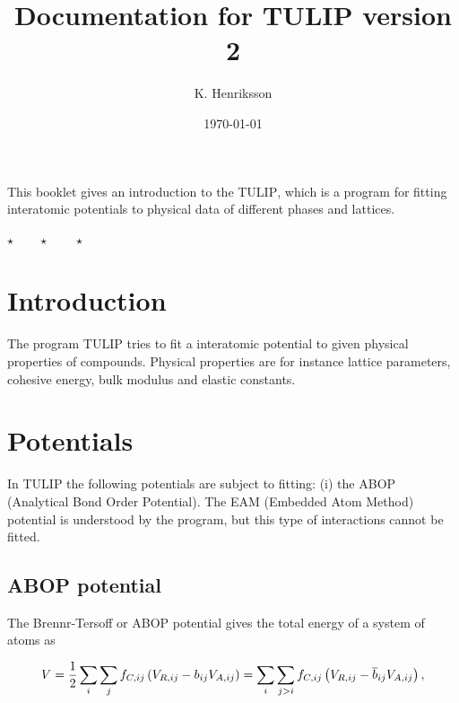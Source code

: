 \documentclass[a4paper,12pt,onecolumn]{article}
\newcommand{\stars}{\begin{center} \vspace{0.5cm}$\star \qquad \star \qquad \star$\vspace{0.5cm}\end{center}}
\begin{document}
\title{
Documentation for \textsc{TULIP}
version 2
}
\author{K. Henriksson}
\date{\today}

\maketitle

\abstract

This booklet gives an introduction to the \textsc{TULIP}, which is
a program for fitting interatomic potentials to physical data
of different phases and lattices.

\stars


\tableofcontents





\section{Introduction}

The program \textsc{TULIP} tries to fit a interatomic potential
to given physical properties of compounds. Physical properties are
for instance lattice parameters, cohesive energy, bulk modulus and
elastic constants.





\section{Potentials}

In \textsc{TULIP} the following potentials are subject to fitting:
(i)  the ABOP (Analytical Bond Order Potential).
The EAM (Embedded Atom Method) potential is understood by the
program, but this type of interactions cannot be fitted.






\subsection{ABOP potential}



The Brennr-Tersoff or ABOP potential gives the total energy of a system of atoms as

\begin{equation}
V = {1 \over 2} \sum_i \sum_{j} f_{C,ij} \left( V_{R,ij} - b_{ij} V_{A,ij} \right)
= \sum_i \sum_{j>i} f_{C,ij} \left( V_{R,ij} - \overline{b}_{ij} V_{A,ij} \right),
\label{eq:abop}
\end{equation}
\end{document}
